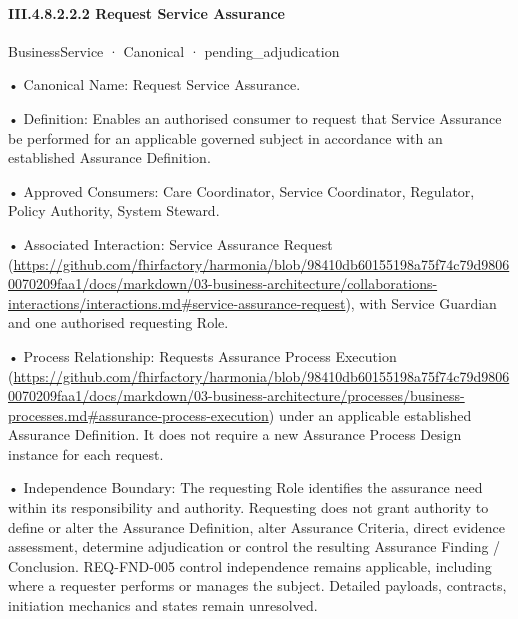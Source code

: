 \paragraph*{III.4.8.2.2.2 Request Service Assurance}
\label{navigation:III.4.8.2.2.2}

\label{element:a76c0be369744fcfb5eb91b90c9b59e7}
{\small BusinessService · Canonical · pending\_adjudication}\par

•
Canonical Name: Request Service Assurance.



•
Definition: Enables an authorised consumer to request that Service Assurance be performed for an applicable governed subject in accordance with an established Assurance Definition.



•
Approved Consumers: Care Coordinator, Service Coordinator, Regulator, Policy Authority, System Steward.



•
Associated Interaction: Service Assurance Request (\url{https://github.com/fhirfactory/harmonia/blob/98410db60155198a75f74c79d98060070209faa1/docs/markdown/03-business-architecture/collaborations-interactions/interactions.md#service-assurance-request}), with Service Guardian and one authorised requesting Role.



•
Process Relationship: Requests Assurance Process Execution (\url{https://github.com/fhirfactory/harmonia/blob/98410db60155198a75f74c79d98060070209faa1/docs/markdown/03-business-architecture/processes/business-processes.md#assurance-process-execution}) under an applicable established Assurance Definition. It does not require a new Assurance Process Design instance for each request.



•
Independence Boundary: The requesting Role identifies the assurance need within its responsibility and authority. Requesting does not grant authority to define or alter the Assurance Definition, alter Assurance Criteria, direct evidence assessment, determine adjudication or control the resulting Assurance Finding / Conclusion. REQ-FND-005 control independence remains applicable, including where a requester performs or manages the subject. Detailed payloads, contracts, initiation mechanics and states remain unresolved.



